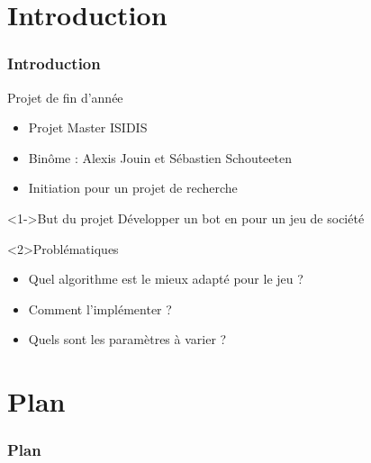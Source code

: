 \section*{Introduction}
	\begin{frame}
		\frametitle{Introduction}
		
		\begin{block}{Projet de fin d'année}
			\begin{itemize}
			\item Projet Master ISIDIS
			\item Binôme : Alexis Jouin et Sébastien Schouteeten
			\item Initiation pour un projet de recherche	
			\end{itemize}
		\end{block}
	
		\begin{block}<1->{But du projet}		
			Développer un bot en \java pour un jeu de société \himalaya		
		\end{block}
	
		\begin{alertblock}<2>{Problématiques}
			\begin{itemize}
				\item Quel algorithme est le mieux adapté pour le jeu \himalaya ?
				\item Comment l'implémenter ?
				\item Quels sont les paramètres à varier ?
			\end{itemize}
		\end{alertblock}
	
	\end{frame}
	
	
\section*{Plan}
	\begin{frame} 
		\frametitle{Plan}
		\tableofcontents
	\end{frame}
